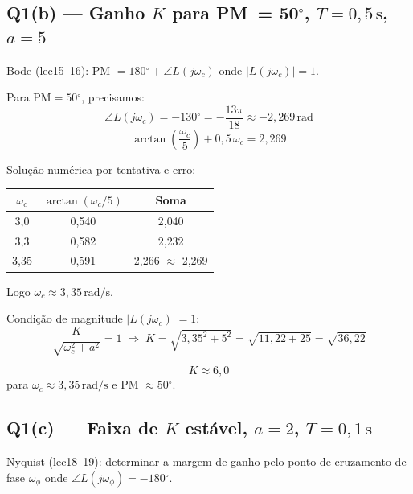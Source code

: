 \documentclass[12pt,a4paper]{article}
\newcommand{\degrees}{\ensuremath{^{\circ}}}
\begin{document}
\subsection*{Q1(b) — Ganho $K$ para PM~= 50\degrees{}, $T=0{,}5\,\mathrm{s}$, $a=5$}

\begin{metodo}
  Bode (lec15--16): PM $= 180\degrees + \angle L(j\omega_c)$ onde
  $|L(j\omega_c)| = 1$.
\end{metodo}

Para PM$= 50\degrees$, precisamos:
\[
  \angle L(j\omega_c) = -130\degrees = -\frac{13\pi}{18} \approx -2{,}269\,\text{rad}
\]
\[
  \arctan\!\!\left(\frac{\omega_c}{5}\right) + 0{,}5\,\omega_c = 2{,}269
\]

Solução numérica por tentativa e erro:

\begin{center}
\begin{tabular}{ccc}
\toprule
$\omega_c$ & $\arctan(\omega_c/5)$ & Soma \\
\midrule
3{,}0 & 0{,}540 & 2{,}040 \\
3{,}3 & 0{,}582 & 2{,}232 \\
3{,}35 & 0{,}591 & 2{,}266 $\approx$ 2{,}269 \\
\bottomrule
\end{tabular}
\end{center}

Logo $\omega_c \approx 3{,}35\,\text{rad/s}$.

Condição de magnitude $|L(j\omega_c)| = 1$:
\[
  \frac{K}{\sqrt{\omega_c^2 + a^2}} = 1
  \;\Rightarrow\;
  K = \sqrt{3{,}35^2 + 5^2} = \sqrt{11{,}22 + 25} = \sqrt{36{,}22}
\]

\begin{resposta}
\[
  \boxed{K \approx 6{,}0}
\]
para $\omega_c \approx 3{,}35\,\text{rad/s}$ e PM $\approx 50\degrees$.
\end{resposta}

\subsection*{Q1(c) — Faixa de $K$ estável, $a=2$, $T=0{,}1\,\mathrm{s}$}

\begin{metodo}
  Nyquist (lec18--19): determinar a margem de ganho pelo ponto de cruzamento
  de fase $\omega_\phi$ onde $\angle L(j\omega_\phi) = -180\degrees$.
\end{metodo}
\end{document}
